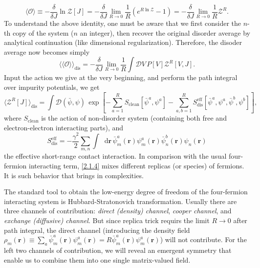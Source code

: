 \documentclass[10pt,nofootinbib,letterpaper]{revtex4}
\newcommand*\dd{\mathop{}\!\mathrm{d}}
\def\Z{\mathcal{Z}}
\def\D{\mathcal{D}}
\begin{document}
		\begin{equation*}
			\langle\mathcal{O}\rangle\equiv-\dfrac{\delta}{\delta J}\ln\Z[J]=-\dfrac{\delta}{\delta J}\lim_{R\rightarrow0}\dfrac{1}{R}(e^{R\ln\Z}-1)=-\dfrac{\delta}{\delta J}\lim_{R\rightarrow0}\dfrac{1}{R}\Z^R.
		\end{equation*}
		To understand the above identity, one must be aware that we first consider the $n$-th copy of the system ($n$ an integer), then recover the original disorder average by analytical continuation (like dimensional regularization). Therefore, the disoder average now becomes simply
		\begin{equation}\label{2.1.3}
			\langle\langle\mathcal{O}\rangle\rangle_{\text{dis}}=-\dfrac{\delta}{\delta J}\lim_{R\rightarrow0}\dfrac{1}{R}\int\D V\,P[V]\Z^R[V,J].
		\end{equation}
		\indent Input the action we give at the very beginning, and perform the path integral over impurity potentials, we get
		\begin{equation*}
			\langle \Z^R[J]\rangle_{\text{dis}}=\int\D(\bar\psi,\psi)\,\exp \left[-\sum_{a=1}^R S_{\text{clean}}[\bar\psi^a,\psi^a]-\sum_{a,b=1}^R S_{\text{dis}}^{\text{eff}}[\bar\psi^a,\psi^a,\bar\psi^b,\psi^b]\right],
		\end{equation*}
		where $S_{\text{clean}}$ is the action of non-disorder system (containing both free and electron-electron interacting parts), and
		\begin{equation}\label{2.1.4}
			S_{\text{dis}}^{\text{eff}}=-\dfrac{\gamma^2}{2}\sum_{m,n}\int\dd\bm{r}\,\bar\psi^a_m(\bm{r})\psi^a_m(\bm{r})\bar\psi^b_n(\bm{r})\psi_n(\bm{r})
		\end{equation}
		the effective short-range contact interaction. In comparison with the usual four-fermion interacting term, \eqref{2.1.4} mixes different replicas (or species) of fermions. It is such behavior that brings in complexities.\par
		The standard tool to obtain the low-energy degree of freedom of the four-fermion interacting system is Hubbard-Stratonovich transformation. Usually there are three channels of contribution: \emph{direct (density) channel}, \emph{cooper channel}, and \emph{exchange (diffusive) channel}. But since replica trick requirs the limit $R\rightarrow0$ after path integral, the direct channel (introducing the density field $\rho_m(\bm{r})\equiv\sum_a\bar\psi^a_m(\bm{r})\psi^a_m(\bm{r})=R\bar\psi^a_m(\bm{r})\psi^a_m(\bm{r})$) will not contribute. For the left two channels of contribution, we will reveal an emergent symmetry that enable us to combine them into one single matrix-valued field.\par
\end{document}
